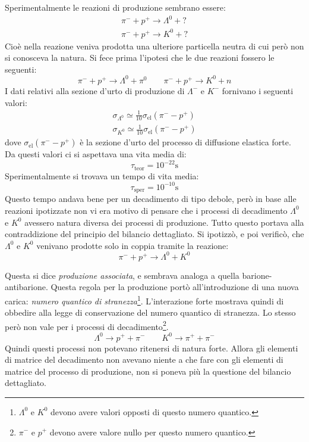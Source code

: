 Sperimentalmente le reazioni di produzione sembrano essere:
\begin{gather}
\pi^-+p^+\rightarrow \Lambda^0+?\\
\pi^-+p^+\rightarrow K^0+?
\end{gather}
Cioè nella reazione veniva prodotta una ulteriore particella neutra di cui 
però
non si conosceva la natura. Si fece prima l'ipotesi che le due reazioni fossero
le seguenti:
\begin{equation}
\pi^-+p^+\rightarrow \Lambda^0+\pi^0\qquad \pi^-+p^+\rightarrow K^0+n
\end{equation}
I dati relativi alla sezione d'urto di produzione di $\Lambda^-$ e $K^-$
fornivano i seguenti valori:
\begin{gather}
\sigma_{\Lambda^0}\simeq\frac{1}{10}\sigma_\text{el}(\pi^--p^+)\\
\sigma_{K^0}\simeq \frac{1}{10}\sigma_\text{el}(\pi^--p^+)
\end{gather}
dove $\sigma_\text{el}(\pi^--p^+)$ è la sezione d'urto del processo di 
diffusione
elastica forte.
Da questi valori ci si aspettava una vita media di:
\[
\tau_{\text{teor}}=10^{-22}\si{\second}
\]
Sperimentalmente si trovava un tempo di vita media:
\[
\tau_{\text{sper}}=10^{-10}\si{\second}
\]
Questo tempo andava bene per un decadimento di tipo debole, però in base alle
reazioni ipotizzate non vi era motivo di pensare che i processi di decadimento
$\Lambda^0$ e $K^0$
avessero natura diversa dei processi di produzione. Tutto questo portava alla
contraddizione del principio del bilancio dettagliato.
Si ipotizzò, e poi verificò, che $\Lambda^0$ e $K^0$ venivano prodotte solo in
coppia tramite la reazione:
\[
\pi^-+p^+\rightarrow \Lambda^0+K^0
\]

Questa si dice \textit{produzione associata}, e sembrava analoga a quella 
barione-antibarione.
Questa regola per la produzione portò all'introduzione di una nuova carica:
\textit{numero quantico di stranezza}\footnote{$\Lambda^0$ e $K^0$ devono avere 
valori
opposti di questo numero quantico.}.
L'interazione forte mostrava quindi di obbedire alla legge di conservazione del
numero quantico di stranezza. Lo stesso però non vale per i processi di
decadimento\footnote{$\pi^-$ e $p^+$ devono avere valore nullo per questo numero
quantico.}.
\[
\Lambda^0\rightarrow p^++\pi^-\qquad K^0\rightarrow \pi^++\pi^-
\]
Quindi questi processi non potevano ritenersi di natura forte. Allora gli
elementi di matrice  del decadimento non avevano niente a che fare con gli
elementi di matrice  del processo di produzione, non si poneva più la questione
del bilancio dettagliato.

